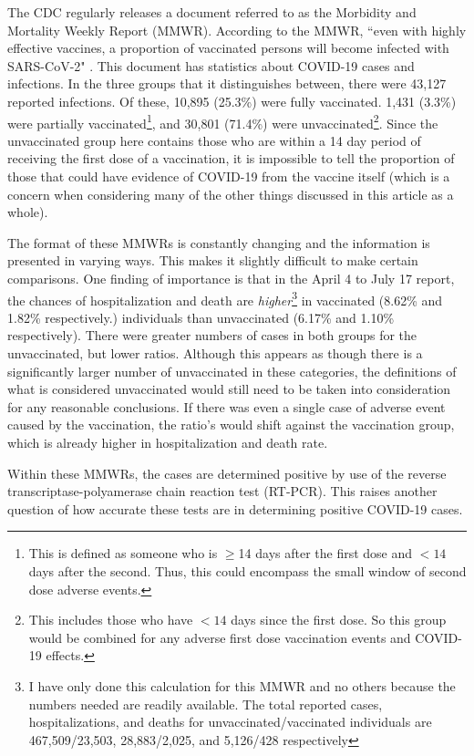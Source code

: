 \documentclass[10pt, a4paper, twocolumn]{book}
\begin{document}
The CDC regularly releases a document referred to as the Morbidity and Mortality Weekly Report (MMWR). According to the MMWR, ``even with highly effective vaccines, a proportion of vaccinated persons will become infected with SARS-CoV-2" \citep{MMWR}. This document has statistics about COVID-19 cases and infections. In the three groups that it distinguishes between, there were 43,127 reported infections. Of these, 10,895 (25.3\%) were fully vaccinated. 1,431 (3.3\%) were partially vaccinated\footnote{This is defined as someone who is $\geq$14 days after the first dose and $<14$ days after the second. Thus, this could encompass the small window of second dose adverse events.}, and 30,801 (71.4\%) were unvaccinated\footnote{This includes those who have $<14$ days since the first dose. So this group would be combined for any adverse first dose vaccination events and COVID-19 effects.}. Since the unvaccinated group here contains those who are within a 14 day period of receiving the first dose of a vaccination, it is impossible to tell the proportion of those that could have evidence of COVID-19 from the vaccine itself (which is a concern when considering many of the other things discussed in this article as a whole).

The format of these MMWRs is constantly changing and the information is presented in varying ways. This makes it slightly difficult to make certain comparisons. One finding of importance is that in the April 4 to July 17 report, the chances of hospitalization and death are \textit{higher}\footnote{I have only done this calculation for this MMWR and no others because the numbers needed are readily available. The total reported cases, hospitalizations, and deaths for unvaccinated/vaccinated individuals are 467,509/23,503, 28,883/2,025, and 5,126/428 respectively} in vaccinated (8.62\% and 1.82\% respectively.) individuals than unvaccinated (6.17\% and 1.10\% respectively). There were greater numbers of cases in both groups for the unvaccinated, but lower ratios. Although this appears as though there is a significantly larger number of unvaccinated in these categories, the definitions of what is considered unvaccinated would still need to be taken into consideration for any reasonable conclusions. If there was even a single case of adverse event caused by the vaccination, the ratio's would shift against the vaccination group, which is already higher in hospitalization and death rate.

Within these MMWRs, the cases are determined positive by use of the reverse transcriptase-polyamerase chain reaction test (RT-PCR). This raises another question of how accurate these tests are in determining positive COVID-19 cases.
\end{document}

